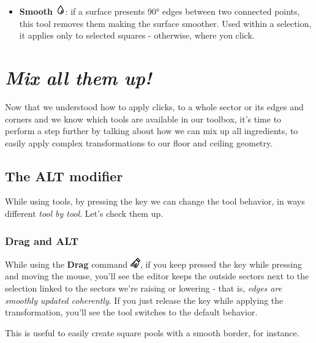 \begin{itemize}
    \item \textbf{Smooth} \includegraphics[scale=0.5]{Resources/icons_toolbox/toolbox_Smooth-16.png}: if a surface presents 90° edges between two connected points, this tool removes them making the surface smoother. Used within a selection, it applies only to selected squares - otherwise, where you click.
\end{itemize}

\chapter{\emph{Mix all them up!}}

Now that we understood how to apply clicks, to a whole sector or its edges and corners and we know which tools are available in our toolbox, it's time to perform a step further by talking about how we can mix up all ingredients, to easily apply complex transformations to our floor and ceiling geometry.


\section{The ALT modifier}

While using tools, by pressing the \keys{\Alt} key we can change the tool behavior, in ways different \emph{tool by tool}. Let's check them up.

\subsection{Drag and ALT}

While using the \textbf{Drag} command \includegraphics[scale=0.5]{Resources/icons_toolbox/toolbox_Drag-16.png}, if you keep pressed the \keys{\Alt} key while pressing  and moving the mouse, you'll see the editor keeps the outside sectors next to the selection linked to the sectors we're raising or lowering - that is, \emph{edges are smoothly updated coherently}. If you just release the \keys{\Alt} key while applying the transformation, you'll see the tool switches to the default behavior.
\par This is useful to easily create square pools with a smooth border, for instance. 

